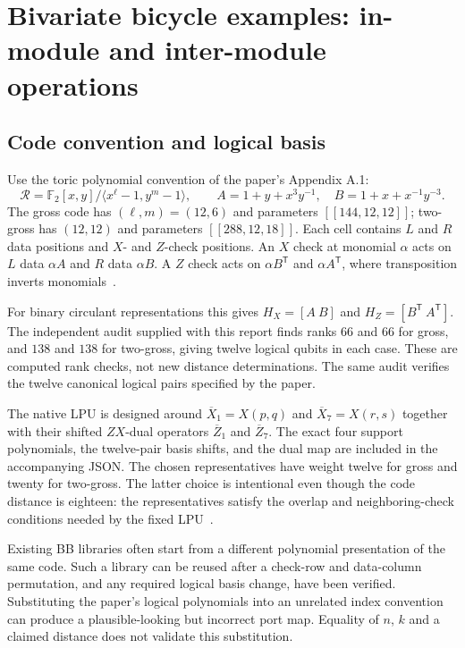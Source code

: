 \documentclass[11pt,a4paper]{article}
\newcommand{\F}{\mathbb{F}_2}
\newcommand{\lx}{\overline{X}}
\newcommand{\lz}{\overline{Z}}
\begin{document}
\section{Bivariate bicycle examples: in-module and inter-module operations}
\label{sec:bb}

\subsection{Code convention and logical basis}

Use the toric polynomial convention of the paper's Appendix A.1:
\begin{equation}
 \mathcal R=\F[x,y]/\langle x^{\ell}-1,y^m-1\rangle,\qquad
 A=1+y+x^3y^{-1},\quad B=1+x+x^{-1}y^{-3}.
 \label{eq:bbpoly}
\end{equation}
The gross code has $(\ell,m)=(12,6)$ and parameters $[[144,12,12]]$; two-gross has $(12,12)$ and parameters $[[288,12,18]]$. Each cell contains $L$ and $R$ data positions and $X$- and $Z$-check positions. An $X$ check at monomial $\alpha$ acts on $L$ data $\alpha A$ and $R$ data $\alpha B$. A $Z$ check acts on $\alpha B^{\mathsf T}$ and $\alpha A^{\mathsf T}$, where transposition inverts monomials~\cite{tdg,bravyi}.

For binary circulant representations this gives $H_X=[A\ B]$ and $H_Z=[B^{\mathsf T}\ A^{\mathsf T}]$. The independent audit supplied with this report finds ranks $66$ and $66$ for gross, and $138$ and $138$ for two-gross, giving twelve logical qubits in each case. These are computed rank checks, not new distance determinations. The same audit verifies the twelve canonical logical pairs specified by the paper.

The native LPU is designed around $\lx_1=X(p,q)$ and $\lx_7=X(r,s)$ together with their shifted $ZX$-dual operators $\lz_1$ and $\lz_7$. The exact four support polynomials, the twelve-pair basis shifts, and the dual map are included in the accompanying JSON. The chosen representatives have weight twelve for gross and twenty for two-gross. The latter choice is intentional even though the code distance is eighteen: the representatives satisfy the overlap and neighboring-check conditions needed by the fixed LPU~\cite{tdg}.

Existing BB libraries often start from a different polynomial presentation of the same code. Such a library can be reused after a check-row and data-column permutation, and any required logical basis change, have been verified. Substituting the paper's logical polynomials into an unrelated index convention can produce a plausible-looking but incorrect port map. Equality of $n$, $k$ and a claimed distance does not validate this substitution.
\end{document}
